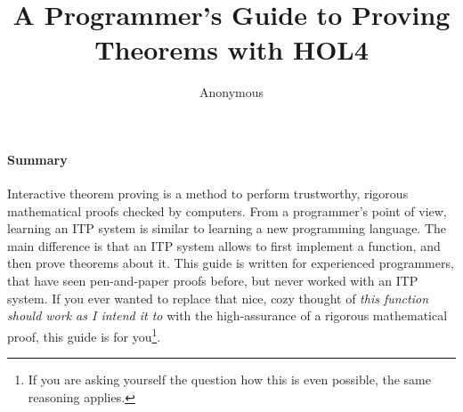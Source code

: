 \documentclass[10pt]{scrartcl}
\title{A Programmer's Guide to Proving Theorems with HOL4}
\author{Anonymous}
\date{}
\begin{document}
\maketitle{}

\paragraph*{Summary}
Interactive theorem proving is a method to perform trustworthy, rigorous
mathematical proofs checked by computers.
From a programmer's point of view, learning an ITP system is similar to
learning a new programming language.
The main difference is that an ITP system allows to first implement a function,
and then prove theorems about it.
This guide is written for experienced programmers, that have seen pen-and-paper
proofs before, but never worked with an ITP system.
If you ever wanted to replace that nice, cozy thought of \emph{this function
should work as I intend it to} with the high-assurance of a rigorous
mathematical proof, this guide is for you\footnote{If you are asking yourself the question how this is even possible, the same reasoning applies.}.
%

%

%

%

%

%

%
\clearpage
\appendix

%
\printbibliography
%
\end{document}
